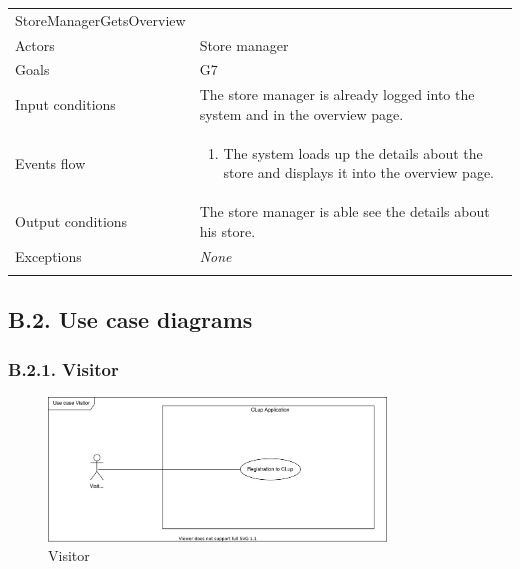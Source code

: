 \clearpage
\begin{longtable}[]{@{}
  >{\raggedright\arraybackslash}p{}
  >{\raggedright\arraybackslash}p{}@{}}
\toprule
StoreManagerGetsOverview & \\ \addlinespace
\midrule
\endhead
Actors & Store manager \\ \addlinespace
Goals & G7 \\ \addlinespace
Input conditions & The store manager is already logged into the system and in the overview page. \\ \addlinespace
Events flow & \begin{enumerate}\vspace{-1.35\baselineskip}
    \item The system loads up the details about the store and displays it into the overview page. 
\vspace{-1.0\baselineskip}\end{enumerate} \\ \addlinespace
Output conditions & The store manager is able see the details about his store. \\ \addlinespace
Exceptions & \emph{None} \\ \addlinespace
\bottomrule
\end{longtable}
\normalsize

\subsection{B.2. Use case diagrams}

\subsubsection{B.2.1. Visitor}

\begin{figure}[H]
\centering
\includegraphics[width=0.8\textwidth]{use_cases/use_case_visitor_registration}
\caption{Visitor}
\end{figure}

